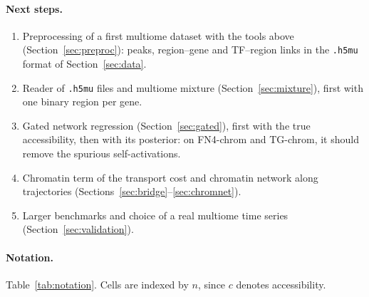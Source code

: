 \documentclass[a4paper, 11pt]{article}
\theoremstyle{plain}
\theoremstyle{remark}
\begin{document}
\paragraph{Next steps.}
\begin{enumerate}[nosep]
\item Preprocessing of a first multiome dataset with the tools above (Section~\ref{sec:preproc}): peaks, region--gene and TF--region links in the \texttt{.h5mu} format of Section~\ref{sec:data}.
\item Reader of \texttt{.h5mu} files and multiome mixture (Section~\ref{sec:mixture}), first with one binary region per gene.
\item Gated network regression (Section~\ref{sec:gated}), first with the true accessibility, then with its posterior: on FN4-chrom and TG-chrom, it should remove the spurious self-activations.
\item Chromatin term of the transport cost and chromatin network along trajectories (Sections~\ref{sec:bridge}--\ref{sec:chromnet}).
\item Larger benchmarks and choice of a real multiome time series (Section~\ref{sec:validation}).
\end{enumerate}

\paragraph{Notation.} Table~\ref{tab:notation}. Cells are indexed by $n$, since $c$ denotes accessibility.
\end{document}
